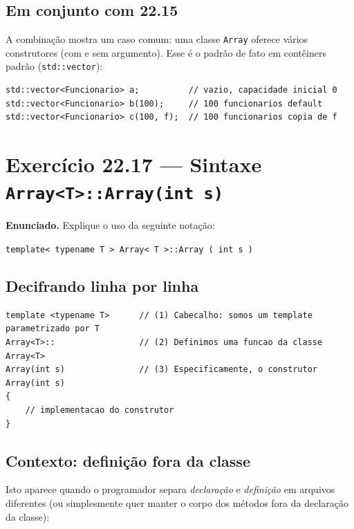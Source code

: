\documentclass[11pt,a4paper]{article}
\begin{document}
\subsection*{Em conjunto com 22.15}

A combina\c{c}\~ao mostra um caso comum: uma classe \texttt{Array} oferece v\'arios construtores (com e sem argumento). Esse \'e o padr\~ao de fato em cont\^einers padr\~ao (\texttt{std::vector}):

\begin{lstlisting}[style=cppcode,numbers=none]
std::vector<Funcionario> a;          // vazio, capacidade inicial 0
std::vector<Funcionario> b(100);     // 100 funcionarios default
std::vector<Funcionario> c(100, f);  // 100 funcionarios copia de f
\end{lstlisting}

\section{Exerc\'icio 22.17 --- Sintaxe \texttt{Array<T>::Array(int s)}}

\begin{enunciado}
\textbf{Enunciado.} Explique o uso da seguinte nota\c{c}\~ao:

\texttt{template< typename T > Array< T >::Array ( int s )}
\end{enunciado}

\subsection*{Decifrando linha por linha}

\begin{lstlisting}[style=cppcode,numbers=none]
template <typename T>      // (1) Cabecalho: somos um template parametrizado por T
Array<T>::                 // (2) Definimos uma funcao da classe Array<T>
Array(int s)               // (3) Especificamente, o construtor Array(int s)
{
    // implementacao do construtor
}
\end{lstlisting}

\subsection*{Contexto: defini\c{c}\~ao fora da classe}

Isto aparece quando o programador separa \emph{declara\c{c}\~ao} e \emph{defini\c{c}\~ao} em arquivos diferentes (ou simplesmente quer manter o corpo dos m\'etodos fora da declara\c{c}\~ao da classe):
\end{document}
